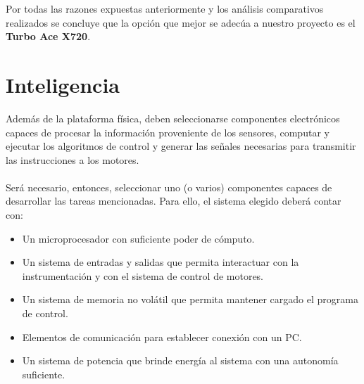\documentclass[main]{subfiles}
\begin{document}
	Por todas las razones expuestas anteriormente y los an\'alisis comparativos realizados se concluye que la opci\'on que mejor se adec\'ua a nuestro proyecto es el \textbf{Turbo Ace X720}. 

\newpage
\section{Inteligencia}
\vspace*{15pt}

Adem\'as de la plataforma f\'isica, deben seleccionarse componentes electr\'onicos capaces de procesar la informaci\'on proveniente de los sensores, computar y ejecutar los algoritmos de control y generar las se\~nales necesarias para transmitir las instrucciones a los motores.\\
\\
Ser\'a necesario, entonces, seleccionar uno (o varios) componentes capaces de desarrollar las tareas mencionadas. Para ello, el sistema elegido deber\'a contar con:

\begin{itemize}
\item Un microprocesador con suficiente poder de c\'omputo.
\item Un sistema de entradas y salidas que permita interactuar con la instrumentaci\'on y con el sistema de control de motores.
\item Un sistema de memoria no vol\'atil que permita mantener cargado el programa de control.
\item Elementos de comunicaci\'on para establecer conexi\'on con un PC.
\item Un sistema de potencia que brinde energ\'ia al sistema con una autonom\'ia suficiente.
\end{itemize}
\end{document}
